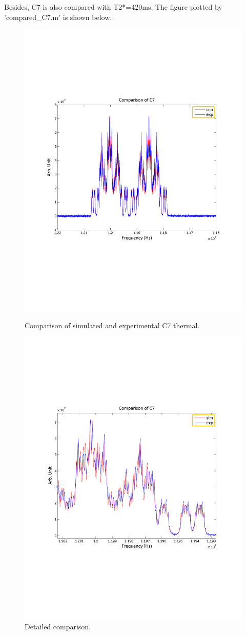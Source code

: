 Besides, C7 is also compared with T2*=420ms. The figure plotted by 'compared\_C7.m' is shown below.

\begin{figure}
\begin{minipage}[hbtp]{0.5\linewidth}
\centering
\includegraphics[width=0.8\columnwidth]{comparison_C7.pdf}
\caption{Comparison of simulated and experimental C7 thermal.}
\label{fig:side:a}
\end{minipage}%
\begin{minipage}[hbtp]{0.5\linewidth}
\centering
\includegraphics[width=0.8\columnwidth]{comparison_C7_zoomin.pdf}
\caption{Detailed comparison.}
\label{fig:side:b}
\end{minipage}
\end{figure}

